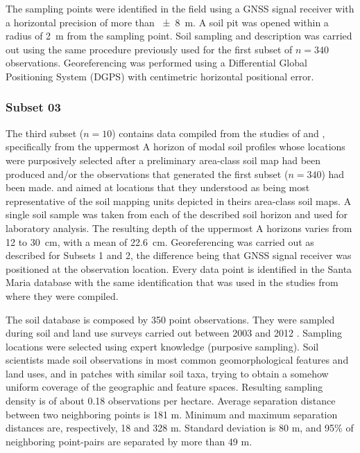 The sampling points were identified in the field using a GNSS signal receiver with a horizontal 
precision of more than \SI{\pm8}{\metre}. A soil pit was opened within a radius of \SI{2}{\metre} from 
the sampling point. Soil sampling and description was carried out using the same procedure previously 
used for the first subset of $n = 340$ observations. Georeferencing was performed using a Differential
Global Positioning System (DGPS) with centimetric horizontal positional error.

\subsubsection{Subset 03}

The third subset ($n = 10$) contains data compiled from the studies of  and
, specifically from the uppermost A horizon of modal soil profiles whose locations 
were purposively selected after a preliminary area-class soil map had been produced and/or the observations
that generated the first subset ($n = 340$) had been made.  and 
aimed at locations that they understood as being most representative of the soil mapping units depicted 
in theirs area-class soil maps. A single soil sample was taken from each of the described soil horizon and 
used for laboratory analysis. The resulting depth of the uppermost A horizons varies from \num{12} to 
\SI{30}{\centi\metre}, with a mean of \SI{22.6}{\centi\metre}. Georeferencing was carried out as described
for Subsets \num{1} and \num{2}, the difference being that GNSS signal receiver was positioned at the
observation location. Every data point is identified in the Santa Maria database with the same  identification that was used in the
studies from where they were compiled.














The soil database is composed by 350 point observations. They were sampled during soil and land use surveys carried out between 2003 and 2012 \cite{Pedron2005, SamuelRosaEtAl2011a, MiguelEtAl2012}. Sampling locations were selected using expert knowledge (purposive sampling). Soil scientists made soil observations in most common geomorphological features and land uses, and in patches with similar soil taxa, trying to obtain a somehow uniform coverage of the geographic and feature spaces. Resulting sampling density is of about 0.18 observations per hectare. Average separation distance between two neighboring points is 181 m. Minimum and maximum separation distances are, respectively, 18 and 328 m. Standard deviation is 80 m, and 95\% of neighboring point-pairs are separated by more than 49 m.



